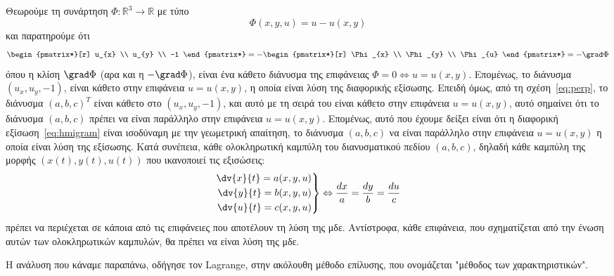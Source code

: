 Θεωρούμε τη συνάρτηση $ \Phi \colon \mathbb{R}^{3} \to \mathbb{R} $ με τύπο 
\[
  \Phi(x,y,u)=u-u(x,y) 
\] 
και παρατηρούμε ότι 
\[
  \begin{pmatrix*}[r] u_{x} \\ u_{y} \\ -1 \end{pmatrix*} = -
  \begin{pmatrix*}[r] \Phi _{x} \\ \Phi _{y} \\ \Phi _{u} \end{pmatrix*} = 
  - \grad \Phi 
\]
όπου η κλίση $ \grad \Phi $ (αρα και η $ - \grad \Phi $), είναι ένα κάθετο διάνυσμα 
της επιφάνειας $ \Phi = 0 \Leftrightarrow u=u(x,y) $. Επομένως, το διάνυσμα 
$ (u_{x},u_{y},-1) $, είναι κάθετο στην επιφάνεια $ u=u(x,y) $, η οποία είναι 
λύση της διαφορικής εξίσωσης.
Επειδή όμως, από τη σχέση~\eqref{eq:perp}, το διάνυσμα $ (a,b,c)^{T} $ 
είναι κάθετο στο $ (u_{x},u_{y},-1) $, και αυτό με τη σειρά του είναι κάθετο 
στην επιφάνεια $ u=u(x,y) $, αυτό σημαίνει ότι το διάνυσμα 
$ (a,b,c) $ πρέπει να είναι παράλληλο στην επιφάνεια $ u=u(x,y) $. Επομένως, 
αυτό που έχουμε δείξει είναι ότι η διαφορική εξίσωση~\eqref{eq:hmigram} είναι 
ισοδύναμη με την γεωμετρική απαίτηση, το διάνυσμα $ (a,b,c) $ να είναι παράλληλο
στην επιφάνεια $ u=u(x,y) $ η οποία είναι λύση της εξίσωσης. 
Κατά συνέπεια, κάθε ολοκληρωτική καμπύλη του διανυσματικού πεδίου $ (a,b,c) $,
δηλαδή κάθε καμπύλη της μορφής $ (x(t),y(t),u(t)) $ που ικανοποιεί τις εξισώσεις:
\[
  \left.
    \begin{aligned}
  \dv{x}{t} = a(x,y,u) \\
  \dv{y}{t} = b(x,y,u) \\
  \dv{u}{t} = c(x,y,u) 
    \end{aligned} 
  \right\} \Leftrightarrow 
  \frac{dx}{a} = \frac{dy}{b} = \frac{du}{c}
 \]
πρέπει να περιέχεται σε κάποια από τις επιφάνειες που αποτέλουν τη λύση της μδε. 
Αντίστροφα, κάθε επιφάνεια, που σχηματίζεται από την ένωση αυτών των ολοκληρωτικών καμπυλών, θα πρέπει να είναι λύση της μδε.

Η ανάλυση που κάναμε παραπάνω, οδήγησε τον Lagrange, στην ακόλουθη μέθοδο επίλυσης, 
που ονομάζεται "μέθοδος των χαρακτηριστικών". 

